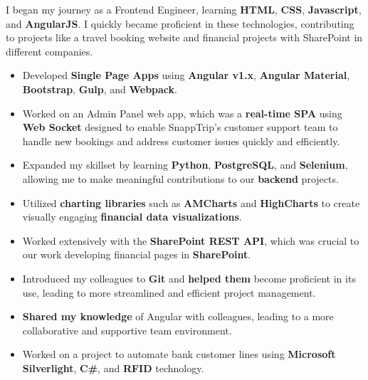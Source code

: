 I began my journey as a Frontend Engineer, learning \textbf{HTML}, \textbf{CSS}, \textbf{Javascript}, and \textbf{AngularJS}. I quickly became proficient in these technologies, contributing to projects like a travel booking website and financial projects with SharePoint in different companies.
\medskip
\begin{itemize}
    \item Developed \textbf{Single Page Apps} using \textbf{Angular v1.x}, \textbf{Angular Material}, \textbf{Bootstrap}, \textbf{Gulp}, and \textbf{Webpack}.
    \item Worked on an Admin Panel web app, which was a \textbf{real-time SPA} using \textbf{Web Socket} designed to enable SnappTrip’s customer support team to handle new bookings and address customer issues quickly and efficiently.
    \item Expanded my skillset by learning \textbf{Python}, \textbf{PostgreSQL}, and \textbf{Selenium}, allowing me to make meaningful contributions to our \textbf{backend} projects.
    \item Utilized \textbf{charting libraries} such as \textbf{AMCharts} and \textbf{HighCharts} to create visually engaging \textbf{financial data visualizations}.
    \item Worked extensively with the \textbf{SharePoint REST API}, which was crucial to our work developing financial pages in \textbf{SharePoint}.
    \item Introduced my colleagues to \textbf{Git} and \textbf{helped them} become proficient in its use, leading to more streamlined and efficient project management.
    \item \textbf{Shared my knowledge} of Angular with colleagues, leading to a more collaborative and supportive team environment.
    \item Worked on a project to automate bank customer lines using \textbf{Microsoft Silverlight}, \textbf{C\#}, and \textbf{RFID} technology.
\end{itemize}
